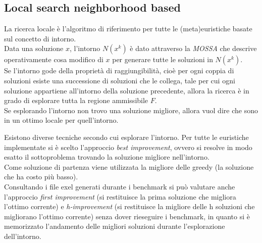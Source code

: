 \documentclass[9pt]{beamer}
\begin{document}
\subsection{Local search neighborhood based}
\begin{frame}[allowframebreaks]{\subsecname}

La ricerca locale è l’algoritmo di riferimento per tutte le (meta)euristiche basate sul concetto di intorno.\\
Data una soluzione $x$, l’intorno $N(x^k)$ è dato attraverso la \emph{MOSSA} che descrive operativamente cosa modifico di $x$ per generare tutte le soluzioni in $N(x^k)$. \\
Se l’intorno gode della proprietà di raggiungibilità, cioè per ogni coppia di soluzioni esiste una successione di soluzioni che le collega, tale per cui ogni soluzione appartiene all’intorno della soluzione precedente, allora la ricerca è in grado di esplorare tutta la regione ammissibile $F$. \\
Se esplorando l’intorno non trovo una soluzione migliore, allora vuol dire che sono in un ottimo locale per quell’intorno.

\framebreak

Esistono diverse tecniche secondo cui esplorare l’intorno. Per tutte le euristiche implementate si è scelto l’approccio \emph{best improvement}, ovvero si resolve in modo esatto il sottoproblema trovando la soluzione migliore nell’intorno.\\
Come soluzione di partenza viene utilizzata la migliore delle greedy (la soluzione che ha costo più basso). \\
Consultando i file exel generati durante i benchmark si può valutare anche l’approccio \emph{first improvement} (si restituisce la prima soluzione che migliora l’ottimo corrente) e \emph{h-improvement} (si restituisce la migliore delle h soluzioni che migliorano l’ottimo corrente) senza dover rieseguire i benchmark, in quanto si è memorizzato l’andamento delle migliori soluzioni durante l’esplorazione dell’intorno.
\end{frame}
\end{document}
